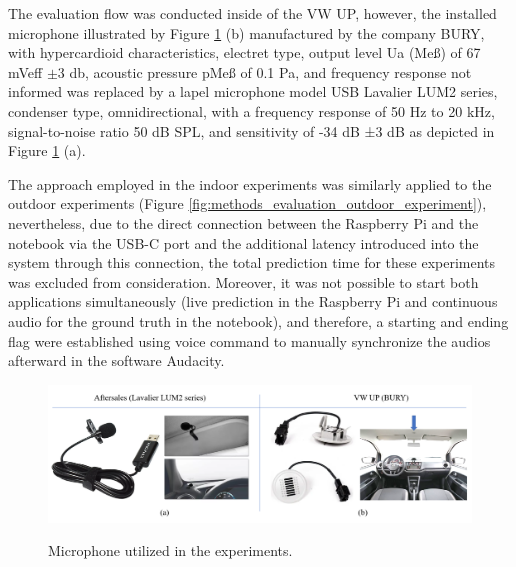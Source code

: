 The evaluation flow was conducted inside of the VW UP, however, the installed microphone illustrated by Figure \ref{fig:methods_evaluation_microphone_aftersales_and_VW_UP} (b) manufactured by the company BURY, with hypercardioid characteristics, electret type, output level Ua (Meß) of 67 mVeff $\pm$3 \gls{db}, acoustic pressure pMeß of 0.1 Pa, and frequency response not informed \cite{BURY2024} was replaced by a lapel microphone model USB Lavalier LUM2 series, condenser type, omnidirectional, with a frequency response of 50 Hz to 20 kHz, signal-to-noise ratio 50 dB SPL, and sensitivity of -34 dB ±3 dB \cite{CKMOVA2021} as depicted in Figure \ref{fig:methods_evaluation_microphone_aftersales_and_VW_UP} (a).

The approach employed in the indoor experiments was similarly applied to the outdoor experiments (Figure \ref{fig:methods_evaluation_outdoor_experiment}), nevertheless, due to the direct connection between the Raspberry Pi and the notebook via the USB-C port and the additional latency introduced into the system through this connection, the total prediction time for these experiments was excluded from consideration. Moreover, it was not possible to start both applications simultaneously (live prediction in the Raspberry Pi and continuous audio for the ground truth in the notebook), and therefore, a starting and ending flag were established using voice command to manually synchronize the audios afterward in the software Audacity.

\begin{figure}[htbp]
    \raggedright
        \caption{Microphone utilized in the experiments.}
        \includegraphics[width=1\textwidth]{resources/images/050-methods/Methods_evaluation_microphone_aftersales_VW_UP.png}
        \label{fig:methods_evaluation_microphone_aftersales_and_VW_UP}
\end{figure}

